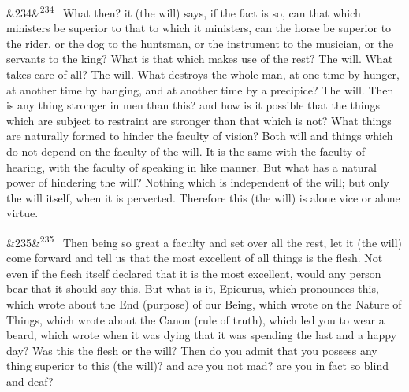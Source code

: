 \documentclass[12pt]{article}
\newcommand{\para}[1][]{\par\noindent\ifx&#1&\else\textsuperscript{\footnotesize #1}~\fi}
\begin{document}
\para[234] What then? it (the will) says, if the fact is so, can that which ministers be superior to that to which it ministers, can the horse be superior to the rider, or the dog to the huntsman, or the instrument to the musician, or the servants to the king? What is that which makes use of the rest? The will. What takes care of all? The will. What destroys the whole man, at one time by hunger, at another time by hanging, and at another time by a precipice? The will. Then is any thing stronger in men than this? and how is it possible that the things which are subject to restraint are stronger than that which is not? What things are naturally formed to hinder the faculty of vision? Both will and things which do not depend on the faculty of the will. It is the same with the faculty of hearing, with the faculty of speaking in like manner. But what has a natural power of hindering the will? Nothing which is independent of the will; but only the will itself, when it is perverted. Therefore this (the will) is alone vice or alone virtue.

\para[235] Then being so great a faculty and set over all the rest, let it (the will) come forward and tell us that the most excellent of all things is the flesh. Not even if the flesh itself declared that it is the most excellent, would any person bear that it should say this. But what is it, Epicurus, which pronounces this, which wrote about the End (purpose) of our Being, which wrote on the Nature of Things, which wrote about the Canon (rule of truth), which led you to wear a beard, which wrote when it was dying that it was spending the last and a happy day? Was this the flesh or the will? Then do you admit that you possess any thing superior to this (the will)? and are you not mad? are you in fact so blind and deaf?
\end{document}
